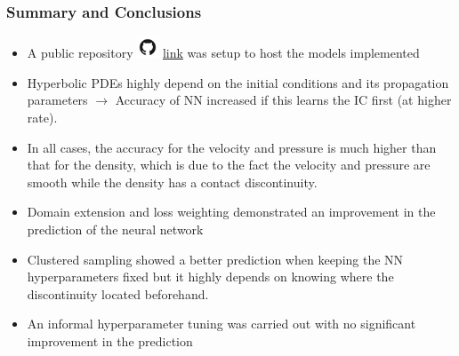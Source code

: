 \documentclass[aspectratio=169]{beamer}
\begin{document}
\begin{frame}\frametitle{Summary and Conclusions}

	\begin{itemize}
		\item A public repository \includegraphics[width=0.05\textwidth]{Figures/github_logo.png} \alert{\href{https://github.com/dalexa10/Machine_Learning/tree/main/5_Scientific_Machine_Learning/5_PINNs_Euler_Equations}{link}} was setup to host the models implemented
		
		\item Hyperbolic PDEs highly depend on the initial conditions and its propagation parameters $\rightarrow$ Accuracy of NN increased if this learns the IC first (at higher rate).
		
		\item In all cases, the accuracy for the velocity and pressure is much higher than that for the density, which is due to the fact the
		velocity and pressure are smooth while the density has a contact discontinuity.
		
		\item Domain extension and loss weighting demonstrated an improvement in the prediction of the neural network
		
		\item Clustered sampling showed a better prediction when keeping the NN hyperparameters fixed but it highly depends
		on knowing where the discontinuity located beforehand.
		
		\item An informal hyperparameter tuning was carried out with no significant improvement in the prediction
	
	
	\end{itemize}

	
	
\end{frame}
\end{document}
